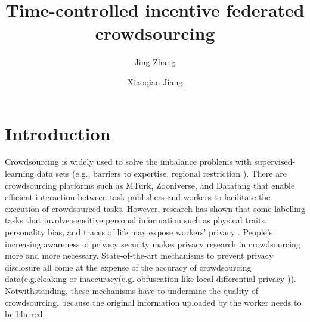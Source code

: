 \documentclass[final,1p,times]{elsarticle}
\begin{document}
	
\begin{frontmatter}
		
\title{Time-controlled incentive federated crowdsourcing}
		

\author[mymainaddress]{Jing Zhang 
}
		
\author[secondaddress]{Xiaoqian Jiang}
		
		
\address[mymainaddress]{School of Cyber Science and Engineering, Southeast University, No. 2 SEU Road, Nanjing 211189, China}
\address[secondaddress]{School of Cyber Science and Engineering, Southeast University, No. 2 SEU Road, Nanjing 211189, China}
		
\begin{abstract}
			
\end{abstract}
\begin{keyword}
	
\end{keyword}
\end{frontmatter}

\section{Introduction} 
Crowdsourcing is widely used to solve the imbalance problems with supervised-learning data sets (e.g., barriers to expertise, regional restriction \citep{ye2018crowdsourcing,sigurdsson2016hollywood,amgad2022nucls}). There are crowdsourcing platforms such as MTurk, Zooniverse, and Datatang that enable efficient interaction between task publishers and workers to facilitate the execution of crowdsourced tasks. However, research has shown that some labelling tasks that involve sensitive personal information such as physical traits, personality bias, and traces of life may expose workers' privacy \citep{xia2020privacy}. People's increasing awareness of privacy security makes privacy research in crowdsourcing more and more necessary. State-of-the-art mechanisms to prevent privacy disclosure all come at the expense of the accuracy of crowdsourcing data(e.g.cloaking \citep{pournajaf2014spatial,ren2022towards} or inaccuracy(e.g. obfuscation like local differential privacy \citep{wang2018geographic,wei2019differential}))\citep{wang2020federated}. Notwithstanding, these mechanisms have to undermine the quality of crowdsourcing, because the original information uploaded by the worker needs to be blurred.
\end{document}
